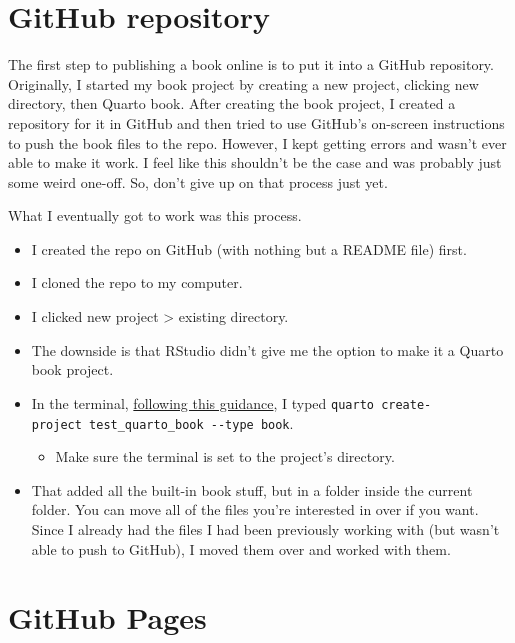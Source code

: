 \documentclass[
  letterpaper,
  DIV=11,
  numbers=noendperiod]{scrreprt}
\providecommand{\tightlist}{%
  \setlength{\itemsep}{0pt}\setlength{\parskip}{0pt}}\usepackage{longtable,booktabs,array}
\begin{document}
\section{GitHub repository}\label{github-repository}

The first step to publishing a book online is to put it into a GitHub
repository. Originally, I started my book project by creating a new
project, clicking new directory, then Quarto book. After creating the
book project, I created a repository for it in GitHub and then tried to
use GitHub's on-screen instructions to push the book files to the repo.
However, I kept getting errors and wasn't ever able to make it work. I
feel like this shouldn't be the case and was probably just some weird
one-off. So, don't give up on that process just yet.

What I eventually got to work was this process.

\begin{itemize}
\tightlist
\item
  I created the repo on GitHub (with nothing but a README file) first.
\item
  I cloned the repo to my computer.
\item
  I clicked new project \textgreater{} existing directory.
\item
  The downside is that RStudio didn't give me the option to make it a
  Quarto book project.
\item
  In the terminal, \href{https://quarto.org/docs/books/}{following this
  guidance}, I typed
  \texttt{quarto\ create-project\ test\_quarto\_book\ -\/-type\ book}.

  \begin{itemize}
  \tightlist
  \item
    Make sure the terminal is set to the project's directory.
  \end{itemize}
\item
  That added all the built-in book stuff, but in a folder inside the
  current folder. You can move all of the files you're interested in
  over if you want. Since I already had the files I had been previously
  working with (but wasn't able to push to GitHub), I moved them over
  and worked with them.
\end{itemize}

\section{GitHub Pages}\label{github-pages}
\end{document}
